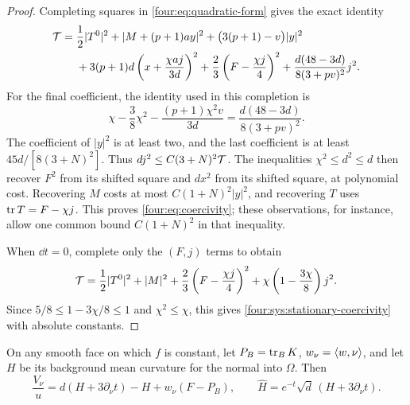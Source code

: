 \begin{proof}
Completing squares in \eqref{four:eq:quadratic-form} gives the exact identity
\begin{equation}\label{four:sys:exact-squares}
\begin{aligned}
 \mathcal T={}&\frac12|T^0|^2+|M+(p+1)ay|^2
        +\bigl(3(p+1)-v\bigr)|y|^2\\
 &+3(p+1)d\left(x+\frac{\chi a j}{3d}\right)^2
       +\frac23\left(F-\frac{\chi j}{4}\right)^2
       +\frac{d(48-3d)}{8(3+pv)^2}j^2.
\end{aligned}
\end{equation}
For the final coefficient, the identity used in this completion is
\[
 \chi-\frac38\chi^2-\frac{(p+1)\chi^2v}{3d}
                 =\frac{d(48-3d)}{8(3+pv)^2}.
\]
The coefficient of $|y|^2$ is at least two, and the last coefficient is
at least $45d/[8(3+N)^2]$.  Thus $d j^2\le C(3+N)^2\mathcal T$.
The inequalities $\chi^2\le d^2\le d$ then recover $F^2$ from its
shifted square and $d x^2$ from its shifted square, at polynomial cost.
Recovering $M$ costs at most $C(1+N)^2|y|^2$, and recovering $T$ uses
$\operatorname{tr} T=F-\chi j$.  This proves \eqref{four:eq:coercivity}; these observations,
for instance, allow one common bound $C(1+N)^2$ in that inequality.

When $\dd t=0$, complete only the $(F,j)$ terms to obtain
\begin{equation}\label{four:sys:stationary-squares}
 \mathcal T=\frac12|T^0|^2+|M|^2
      +\frac23\left(F-\frac{\chi j}{4}\right)^2
      +\chi\left(1-\frac{3\chi}{8}\right)j^2.
\end{equation}
Since $5/8\le1-3\chi/8\le1$ and $\chi^2\le\chi$, this gives
\eqref{four:sys:stationary-coercivity} with absolute constants.
\end{proof}

\begin{lemma}\label{four:sys:boundary-lemma}
On any smooth face on which $f$ is constant, let
$P_B=\operatorname{tr}_BK$, $w_\nu=\langle w,\nu\rangle$, and let $H$ be its background
mean curvature for the normal into $\Omega$.  Then
\begin{equation}\label{four:eq:boundary-identity}
 \frac{V_\nu}{u}
   =d(H+3\partial_\nu t)-H+w_\nu(F-P_B),\qquad
 \widehat H=e^{-t}\sqrt d\,(H+3\partial_\nu t).
\end{equation}
\end{lemma}

